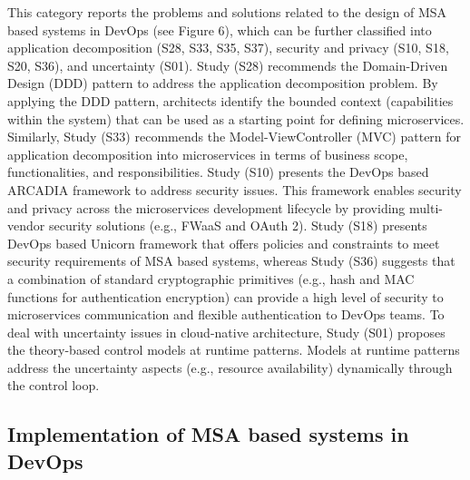 This category reports the problems and solutions related to the design of MSA based systems in DevOps (see Figure 6), which can be further classified into application decomposition (S28, S33, S35, S37), security and privacy (S10, S18, S20, S36), and uncertainty (S01). Study (S28) recommends the Domain-Driven Design (DDD) pattern to address the application decomposition problem. By applying the DDD pattern, architects identify the bounded context (capabilities within the system) that can be used as a starting point for defining microservices. Similarly, Study (S33) recommends the Model-ViewController (MVC) pattern for application decomposition into microservices in terms of business scope, functionalities, and responsibilities. Study (S10) presents the DevOps based ARCADIA framework to address security issues. This framework enables security and privacy across the microservices development lifecycle by providing multi-vendor security solutions (e.g., FWaaS and OAuth 2). Study (S18) presents DevOps based Unicorn framework that offers policies and constraints to meet security requirements of MSA based systems, whereas Study (S36) suggests that a combination of standard cryptographic primitives (e.g., hash and MAC functions for authentication encryption) can provide a high level of security to microservices communication and flexible authentication to DevOps teams. To deal with uncertainty issues in cloud-native architecture, Study (S01) proposes the theory-based control models at runtime patterns. Models at runtime patterns address the uncertainty aspects (e.g., resource availability) dynamically through the control loop.

\subsection{Implementation of MSA based systems in DevOps}

